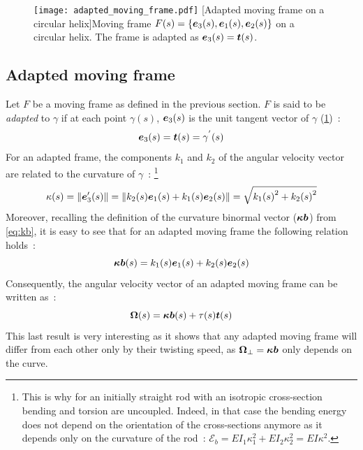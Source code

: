 \begin{figure}[t]
\centering
\texttt{[image: adapted\_moving\_frame.pdf]}
[Adapted moving frame on a circular helix]{Moving frame $F(s) =\{\boldsymbol{e}_{3}(s),\boldsymbol{e}_{1}(s),\boldsymbol{e}_{2}(s)\}$ on a circular helix. The frame is adapted as $\boldsymbol{e}_3(s) = \boldsymbol{t}(s)$.}
\label{fig:adapted}
\end{figure}

\subsection{Adapted moving frame}
\label{sec:amf}
Let $F$ be a moving frame as defined in the previous section. $F$ is said to be \emph{adapted} to $\gamma$ if at each point $\gamma(s)$, $\boldsymbol{e}_{3}(s)$ is the unit tangent vector of $\gamma$ (\cref{fig:adapted})~:
\begin{equation}
	\boldsymbol{e}_{3}(s) = \boldsymbol{t}(s) = \gamma^{'}(s)
\end{equation}
For an adapted frame, the components $k_1$ and $k_2$ of the angular velocity vector are related to the curvature of $\gamma$~: \footnote{This is why for an initially straight rod with an isotropic cross-section bending and torsion are uncoupled. Indeed, in that case the bending energy does not depend on the orientation of the cross-sections anymore as it depends only on the curvature of the rod~: $\mathcal{E}_b = EI_1\kappa_1^2 + EI_2\kappa_2^2 = EI\kappa^2$.}
\begin{equation}
	\kappa(s) = \lVert\boldsymbol{e}'_{3}(s)\rVert = \lVert k_2(s)\boldsymbol{e}_1(s) + k_1(s)\boldsymbol{e}_2(s)\rVert = \sqrt{{k_{1}(s)}^2 + {k_{2}(s)}^2}
\end{equation}
Moreover, recalling the definition of the curvature binormal vector ($\boldsymbol{\kappa b}$) from \cref{eq:kb}, it is easy to see that for an adapted moving frame the following relation holds~:
 \begin{equation}
	\boldsymbol{\kappa b}(s) = k_1(s) \boldsymbol{e}_1(s) +  k_2(s) \boldsymbol{e}_2(s) \label{eq:amf_kb}
\end{equation}
Consequently, the angular velocity vector of an adapted moving frame can be written as~:
 \begin{equation}
	\boldsymbol{\Omega}(s) = \boldsymbol{\kappa b}(s)  + \tau(s) \boldsymbol{t}(s)
\end{equation}
This last result is very interesting as it shows that any adapted moving frame will differ from each other only by their twisting speed, as $\boldsymbol{\Omega}_{\perp} =  \boldsymbol{\kappa b}$ only depends on the curve.

